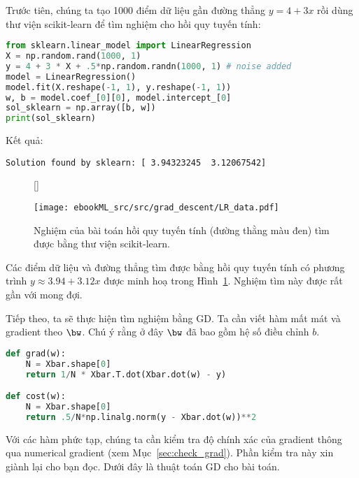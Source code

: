Trước tiên, chúng ta tạo 1000 điểm dữ liệu gần đường thẳng $y = 4 + 3x$ rồi dùng thư viện scikit-learn để tìm nghiệm cho hồi quy tuyến tính:

\begin{lstlisting}[language=Python]
from sklearn.linear_model import LinearRegression
X = np.random.rand(1000, 1)
y = 4 + 3 * X + .5*np.random.randn(1000, 1) # noise added
model = LinearRegression()
model.fit(X.reshape(-1, 1), y.reshape(-1, 1))
w, b = model.coef_[0][0], model.intercept_[0]
sol_sklearn = np.array([b, w])
print(sol_sklearn)
\end{lstlisting}
Kết quả:
\begin{lstlisting}
Solution found by sklearn: [ 3.94323245  3.12067542]
\end{lstlisting}


\begin{figure}[t]
[\FBwidth]
{\caption{
Nghiệm của bài toán hồi quy tuyến tính (đường thằng màu đen) tìm được bằng
thư viện scikit-learn.
}
\label{fig:7_lr_sklearn}}
{ %

\texttt{[image: ebookML\_src/src/grad\_descent/LR\_data.pdf]}
}
\end{figure}
Các điểm dữ liệu và đường thẳng tìm được bằng hồi quy tuyến tính có phương trình
$y \approx 3.94 + 3.12x$ được minh hoạ trong Hình~\ref{fig:7_lr_sklearn}. Nghiệm
tìm này được rất gần với mong đợi.

Tiếp theo, ta sẽ thực hiện tìm nghiệm bằng GD. Ta cần viết hàm mất mát và gradient theo $\bw$. Chú ý rằng ở đây $\bw$ đã bao gồm hệ số điều chỉnh $b$.

\begin{lstlisting}[language=Python]
def grad(w):
    N = Xbar.shape[0]
    return 1/N * Xbar.T.dot(Xbar.dot(w) - y)

def cost(w):
    N = Xbar.shape[0]
    return .5/N*np.linalg.norm(y - Xbar.dot(w))**2
\end{lstlisting}

Với các hàm phức tạp, chúng ta cần kiểm tra độ chính xác của gradient thông
qua numerical gradient (xem Mục~\ref{sec:check_grad}). Phần kiểm tra này xin giành lại cho bạn đọc. Dưới đây là thuật toán GD cho bài toán.


